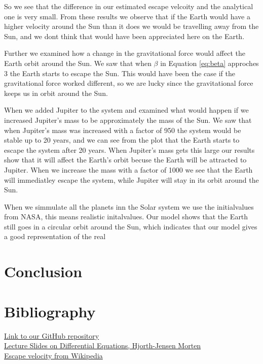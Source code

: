 \documentclass{article}
\begin{document}
So we see that the difference in our estimated escape velcoity and the analytical one is very small. From these results we observe that if the Earth would have a higher velocity around the Sun than it does we would be travelling away from the Sun, and we dont think that would have been appreciated here on the Earth.

Further we examined how a change in the gravitational force would affect the Earth orbit around the Sun. We saw that when $\beta$ in Equation \ref{eq:beta} approches 3 the Earth starts to escape the Sun. This would have been the case if the gravitational force worked different, so we are lucky since the gravitational force keeps us in orbit around the Sun.

When we added Jupiter to the system and examined what would happen if we increased Jupiter's mass to be approximately the mass of the Sun. We saw that when Jupiter's mass was increased with a factor of 950 the system would be stable up to 20 years, and we can see from the plot that the Earth starts to escape the system after 20 years. When Jupiter's mass gets this large our results show that it will affect the Earth's orbit becuse the Earth will be attracted to Jupiter. When we increase the mass with a factor of 1000 we see that the Earth will immediatley escape the system, while Jupiter will stay in its orbit around the Sun.

When we simmulate all the planets inn the Solar system we use the initialvalues from NASA, this means realistic initalvalues. Our model shows that the Earth still goes in a circular orbit around the Sun, which indicates that our model gives a good representation of the real



\section{Conclusion}


\newpage
\section{Bibliography}


\href{https://github.com/emmernme/MENA-Compfys/tree/master/Project5}{Link to our GitHub repository}\\

\noindent \href{http://compphysics.github.io/ComputationalPhysics/doc/pub/ode/pdf/ode-print.pdf}{Lecture Slides on Differential Equations, Hjorth-Jensen Morten}\\

\noindent \href{https://en.wikipedia.org/wiki/Escape_velocity}{Escape velocity from Wikipedia}\\
\end{document}
